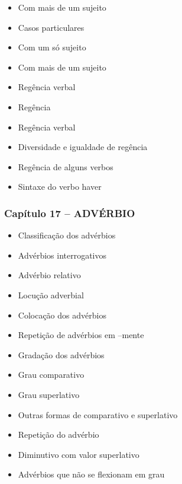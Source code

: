 \documentclass[a4paper,12pt]{article}[abntex2]
\begin{document}
\begin{itemize}
    \item Com mais de um sujeito
    \item Casos particulares
    \item Com um só sujeito
    \item Com mais de um sujeito
    \item Regência verbal
    \item Regência
    \item Regência verbal
    \item Diversidade e igualdade de regência
    \item Regência de alguns verbos
    \item Sintaxe do verbo haver
\end{itemize}

\subsubsection*{Capítulo 17 – ADVÉRBIO}
\begin{itemize}
    \item Classificação dos advérbios
    \item Advérbios interrogativos
    \item Advérbio relativo
    \item Locução adverbial
    \item Colocação dos advérbios
    \item Repetição de advérbios em –mente
    \item Gradação dos advérbios
    \item Grau comparativo
    \item Grau superlativo
    \item Outras formas de comparativo e superlativo
    \item Repetição do advérbio
    \item Diminutivo com valor superlativo
    \item Advérbios que não se flexionam em grau
\end{itemize}
\end{document}

